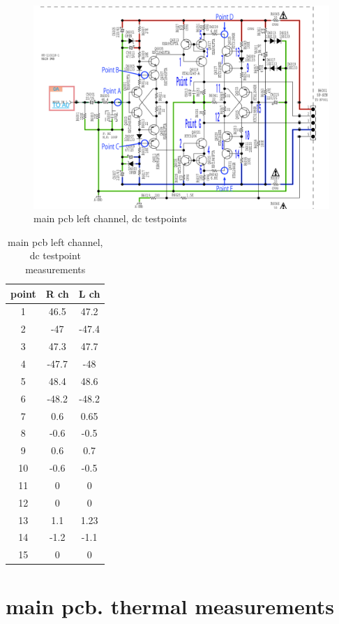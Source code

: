 \documentclass[a4paper,twoside]{report}
\begin{document}
\begin{figure}[hptb!]
    \centering
    \includegraphics[width=12cm]{img_report/dc_testpoints}
 \caption{main pcb left channel, dc testpoints}
 \label{fig:dc-testpoints}
\end{figure}

\begin{table}[hptb!]
\centering
\begin{tabular}{ c | c | c }
    point & R ch & L ch\\ \hline
    1 & 46.5 & 47.2 \\
    2 & -47 & -47.4 \\
    3 & 47.3 & 47.7 \\
    4 & -47.7 & -48 \\
    5 & 48.4 & 48.6 \\
    6 & -48.2 & -48.2 \\
    7 & 0.6 & 0.65 \\
    8 & -0.6 & -0.5 \\
    9 & 0.6 & 0.7 \\
    10 & -0.6 & -0.5 \\
    11 & 0 & 0 \\
    12 & 0 & 0 \\
    13 & 1.1 & 1.23 \\
    14 & -1.2 & -1.1 \\
    15 & 0 & 0 \\
 \end{tabular}
 \caption{main pcb left channel, dc testpoint measurements}
 \label{tab:dc-testpoints-meas}
\end{table}

\newpage

\section{main pcb. thermal measurements} \label{sec:thermal-measurements}
\end{document}
